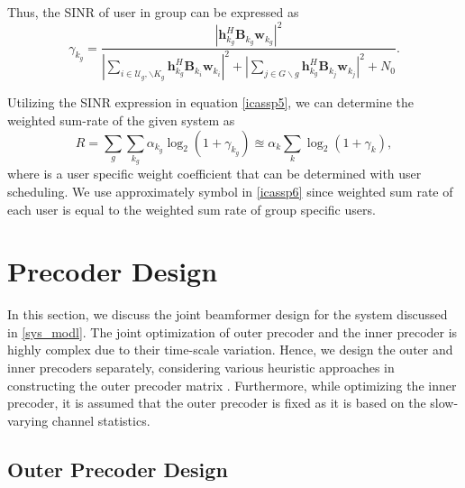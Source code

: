 \documentclass{article}
\begin{document}
Thus, the \ac{SINR} of user  in group  can be expressed as 
\begin{equation}\label{icassp5}
\gamma_{k_g} = \dfrac{|\mathbf{h}_{k_g}^H \mathbf{B}_{k_g} \mathbf{w}_{k_g}|^2}{{|\displaystyle\sum_{i \in \mathcal{U}_g,\backslash K_g} \mathbf{h}_{k_g}^H \mathbf{B}_{k_i} \mathbf{w}_{k_i} |^2 + |\displaystyle\sum_{j \in G \backslash g} \mathbf{h}_{k_g}^H \mathbf{B}_{k_j} \mathbf{w}_{k_j} |^2 + N_0}}.
\end{equation}

Utilizing the \ac{SINR} expression in equation \eqref{icassp5}, we can determine the weighted sum-rate of the given system as
\begin{equation}\label{icassp6}
R = \sum_g \sum_{k_g} \alpha_{k_g} \log_2(1+\gamma_{k_g}) \approxeq \alpha_k \sum_k \log_2(1 + \gamma_k),
\end{equation}
where  is a user specific weight coefficient that can be determined with user scheduling. We use approximately symbol in \eqref{icassp6} since weighted sum rate of each user is equal to the weighted sum rate of group specific users. 
\vspace{-1eM}
\section{Precoder Design}
\label{pre_des}

In this section, we discuss the joint beamformer design for the system discussed in \ref{sys_modl}. The joint optimization of outer precoder  and the inner precoder  is highly complex due to their time-scale variation. Hence, we design the outer and inner precoders separately, considering various heuristic approaches in constructing the outer precoder matrix . Furthermore, while optimizing the inner precoder, it is assumed that the outer precoder  is fixed as it is based on the slow-varying channel statistics.  
\vspace{-1eM}
\subsection{Outer Precoder Design}
\label{outpre}
\end{document}
